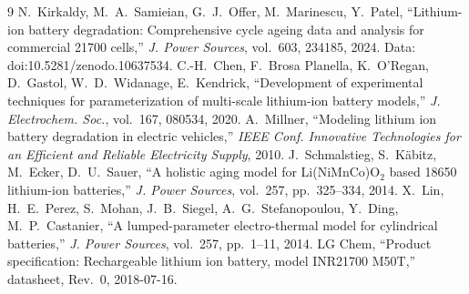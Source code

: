 \documentclass[11pt,a4paper]{article}
\begin{document}
\begin{thebibliography}{9}
 N.~Kirkaldy, M.~A.~Samieian, G.~J.~Offer, M.~Marinescu, Y.~Patel, ``Lithium-ion battery degradation: Comprehensive cycle ageing data and analysis for commercial 21700 cells,'' \emph{J. Power Sources}, vol.~603, 234185, 2024. Data: doi:10.5281/zenodo.10637534.
 C.-H.~Chen, F.~Brosa Planella, K.~O'Regan, D.~Gastol, W.~D.~Widanage, E.~Kendrick, ``Development of experimental techniques for parameterization of multi-scale lithium-ion battery models,'' \emph{J. Electrochem. Soc.}, vol.~167, 080534, 2020.
 A.~Millner, ``Modeling lithium ion battery degradation in electric vehicles,'' \emph{IEEE Conf. Innovative Technologies for an Efficient and Reliable Electricity Supply}, 2010.
 J.~Schmalstieg, S.~K\"abitz, M.~Ecker, D.~U.~Sauer, ``A holistic aging model for Li(NiMnCo)O$_2$ based 18650 lithium-ion batteries,'' \emph{J. Power Sources}, vol.~257, pp.~325--334, 2014.
 X.~Lin, H.~E.~Perez, S.~Mohan, J.~B.~Siegel, A.~G.~Stefanopoulou, Y.~Ding, M.~P.~Castanier, ``A lumped-parameter electro-thermal model for cylindrical batteries,'' \emph{J. Power Sources}, vol.~257, pp.~1--11, 2014.
 LG Chem, ``Product specification: Rechargeable lithium ion battery, model INR21700 M50T,'' datasheet, Rev.~0, 2018-07-16.
\end{thebibliography}
\end{document}
